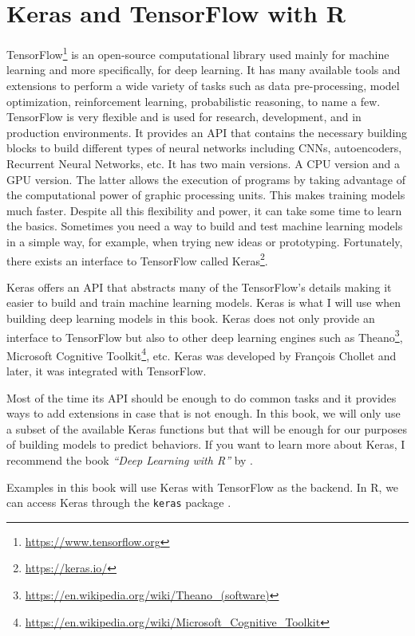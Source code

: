 \documentclass[
  11pt,
]{krantz}
\begin{document}
\hypertarget{keras-and-tensorflow-with-r}{%
\section{Keras and TensorFlow with R}\label{keras-and-tensorflow-with-r}}

TensorFlow\footnote{\url{https://www.tensorflow.org}} is an open-source computational library used mainly for machine learning and more specifically, for deep learning. It has many available tools and extensions to perform a wide variety of tasks such as data pre-processing, model optimization, reinforcement learning, probabilistic reasoning, to name a few. TensorFlow is very flexible and is used for research, development, and in production environments. It provides an API that contains the necessary building blocks to build different types of neural networks including CNNs, autoencoders, Recurrent Neural Networks, etc. It has two main versions. A CPU version and a GPU version. The latter allows the execution of programs by taking advantage of the computational power of graphic processing units. This makes training models much faster. Despite all this flexibility and power, it can take some time to learn the basics. Sometimes you need a way to build and test machine learning models in a simple way, for example, when trying new ideas or prototyping. Fortunately, there exists an interface to TensorFlow called Keras\footnote{\url{https://keras.io/}}.

Keras offers an API that abstracts many of the TensorFlow's details making it easier to build and train machine learning models. Keras is what I will use when building deep learning models in this book. Keras does not only provide an interface to TensorFlow but also to other deep learning engines such as Theano\footnote{\url{https://en.wikipedia.org/wiki/Theano_(software)}}, Microsoft Cognitive Toolkit\footnote{\url{https://en.wikipedia.org/wiki/Microsoft_Cognitive_Toolkit}}, etc. Keras was developed by François Chollet and later, it was integrated with TensorFlow.

Most of the time its API should be enough to do common tasks and it provides ways to add extensions in case that is not enough. In this book, we will only use a subset of the available Keras functions but that will be enough for our purposes of building models to predict behaviors. If you want to learn more about Keras, I recommend the book \emph{``Deep Learning with R''} by \citet{Chollet2018}.

Examples in this book will use Keras with TensorFlow as the backend. In R, we can access Keras through the \texttt{keras} package \citep{keras}.
\end{document}
